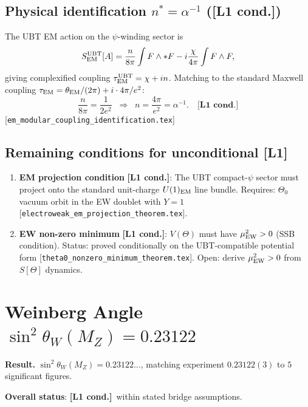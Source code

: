 \documentclass[12pt,a4paper]{article}
\theoremstyle{remark}\newtheorem{remark}[theorem]{Remark}
\newcommand{\Lo}{\textbf{[L1]}}
\newcommand{\Lc}{\textbf{[L1 cond.]}}
\begin{document}
\subsection{Physical identification $n^* = \alpha^{-1}$ (\Lc)}

The UBT EM action on the $\psi$-winding sector is
\[
  S^{\rm UBT}_{\rm EM}[A]
  = \frac{n}{8\pi}\int F\wedge *F - i\frac{\chi}{4\pi}\int F\wedge F,
\]
giving complexified coupling $\tau^{\rm UBT}_{\rm EM} = \chi + in$.
Matching to the standard Maxwell coupling
$\tau_{\rm EM} = \theta_{\rm EM}/(2\pi) + i\cdot4\pi/e^2$:
\[
  \frac{n}{8\pi} = \frac{1}{2e^2}
  \;\;\Longrightarrow\;\;
  n = \frac{4\pi}{e^2} = \alpha^{-1}. \quad \Lc
\]
[\texttt{em\_modular\_coupling\_identification.tex}]

\subsection{Remaining conditions for unconditional \Lo}

\begin{gapbox}
\begin{enumerate}
\item \textbf{EM projection condition} \Lc:
  The UBT compact-$\psi$ sector must project onto the standard
  unit-charge $U(1)_{\rm EM}$ line bundle.
  Requires: $\Theta_0$ vacuum orbit in the EW doublet with $Y=1$
  [\texttt{electroweak\_em\_projection\_theorem.tex}].

\item \textbf{EW non-zero minimum} \Lc:
  $V(\Theta)$ must have $\mu^2_{\rm EW}>0$ (SSB condition).
  Status: proved conditionally on the UBT-compatible potential form
  [\texttt{theta0\_nonzero\_minimum\_theorem.tex}].
  Open: derive $\mu^2_{\rm EW}>0$ from $S[\Theta]$ dynamics.
\end{enumerate}
\end{gapbox}

\section{Weinberg Angle $\sin^2\theta_W(M_Z) = 0.23122$}
\label{sec:weinberg}

\begin{resultbox}
\textbf{Result.}
$\sin^2\theta_W(M_Z) = 0.23122\ldots$,
matching experiment $0.23122(3)$ to $5$ significant figures.

\textbf{Overall status}: \Lc\ within stated bridge assumptions.
\end{resultbox}
\end{document}
